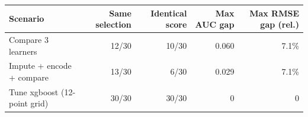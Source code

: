 \begin{tabular}{l rr rr}
\toprule
Scenario & Same selection & Identical score & Max AUC gap & Max RMSE gap (rel.) \\
\midrule
Compare 3 learners & 12/30 & 10/30 & 0.060 & 7.1\% \\
Impute + encode + compare & 13/30 & 6/30 & 0.029 & 7.1\% \\
Tune xgboost (12-point grid) & 30/30 & 30/30 & 0 & 0 \\
\bottomrule
\end{tabular}
